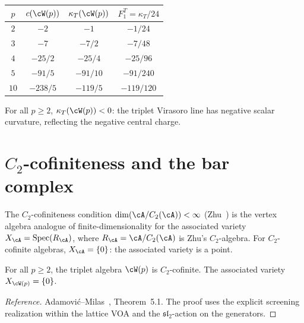 \begin{remark}\label{rem:wp-kappa-values}
\begin{center}
\renewcommand{\arraystretch}{1.3}
\begin{tabular}{cccc}
\toprule
$p$ & $c(\cW(p))$ & $\kappa_T(\cW(p))$ & $F_1^T = \kappa_T/24$ \\
\midrule
$2$ & $-2$ & $-1$ & $-1/24$ \\
$3$ & $-7$ & $-7/2$ & $-7/48$ \\
$4$ & $-25/2$ & $-25/4$ & $-25/96$ \\
$5$ & $-91/5$ & $-91/10$ & $-91/240$ \\
$10$ & $-238/5$ & $-119/5$ & $-119/120$ \\
\bottomrule
\end{tabular}
\end{center}
For all $p \geq 2$, $\kappa_T(\cW(p)) < 0$: the triplet
Virasoro line has negative scalar curvature, reflecting the
negative central charge.
\end{remark}



\section{$C_2$-cofiniteness and the bar complex}
\label{sec:wp-c2-cofinite}

The $C_2$-cofiniteness condition
$\dim(\cA / C_2(\cA)) < \infty$
(Zhu~\cite{Zhu96}) is the vertex algebra analogue of
finite-dimensionality for the associated variety
$X_\cA = \operatorname{Spec}(R_\cA)$, where
$R_\cA = \cA / C_2(\cA)$ is Zhu's $C_2$-algebra.
For $C_2$-cofinite algebras, $X_\cA = \{0\}$: the associated
variety is a point.

\begin{proposition}\label{prop:wp-c2-cofinite}
For all $p \geq 2$, the triplet algebra $\cW(p)$ is
$C_2$-cofinite. The associated variety
$X_{\cW(p)} = \{0\}$.
\end{proposition}

\begin{proof}[Reference]
Adamovi\'c--Milas~\cite{AdamovicMilas2008}, Theorem~5.1.
The proof uses the explicit screening realization within the
lattice VOA and the $\mathfrak{sl}_2$-action on the
generators.
\end{proof}

